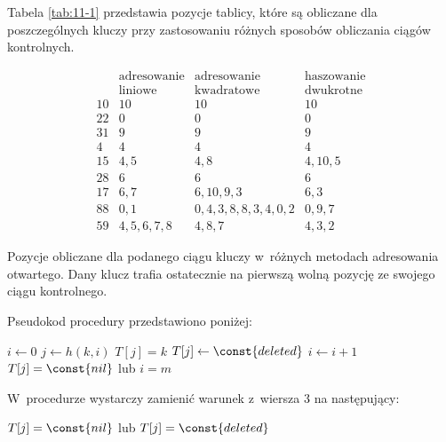 
\exercise %

\noindent Tabela \ref{tab:11-1} przedstawia pozycje tablicy, które są obliczane dla poszczególnych kluczy przy zastosowaniu różnych sposobów obliczania ciągów kontrolnych.

\begin{table}[ht]
	\begin{center}
		\[
			\begin{array}{c|c|c|c}
				& \text{adresowanie} & \text{adresowanie} & \text{haszowanie} \\
				& \text{liniowe} & \text{kwadratowe} & \text{dwukrotne} \\
				\hline
				10 & 10 & 10 & 10 \\
				\hline
				22 & 0 & 0 & 0 \\
				\hline
				31 & 9 & 9 & 9 \\
				\hline
				4 & 4 & 4 & 4 \\
				\hline
				15 & 4,5 & 4,8 & 4,10,5 \\
				\hline
				28 & 6 & 6 & 6 \\
				\hline
				17 & 6,7 & 6,10,9,3 & 6,3 \\
				\hline
				88 & 0,1 & 0,4,3,8,8,3,4,0,2 & 0,9,7 \\
				\hline
				59 & 4,5,6,7,8 & 4,8,7 & 4,3,2
			\end{array}
		\]
	\end{center}
	\caption{Pozycje obliczane dla podanego ciągu kluczy w~różnych metodach adresowania otwartego.
Dany klucz trafia ostatecznie na pierwszą wolną pozycję ze swojego ciągu kontrolnego.} \label{tab:11-1}
\end{table}

\exercise %
Pseudokod procedury  przedstawiono poniżej:
\begin{codebox}
\li	$i\gets0$
\li	\Repeat
		$j\gets h(k,i)$
\li		\If $T[j]=k$
\li			\Then
				$T[j]\gets\const{deleted}$
\li				\Return
			\End
\li		$i\gets i+1$
\li	\Until $T[j]=\const{nil}$ lub $i=m$
\end{codebox}
W~procedurze  wystarczy zamienić warunek z~wiersza 3 na następujący:
\begin{codebox}
\setcounter{codelinenumber}{2}
\li	\If $T[j]=\const{nil}$ lub $T[j]=\const{deleted}$
\end{codebox}

